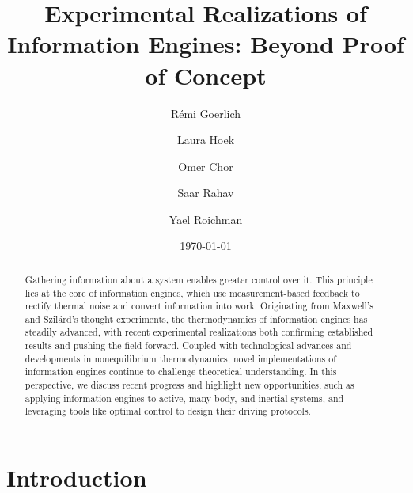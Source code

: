 \documentclass[aps, twocolumn,floatfix,showpacs, superscriptaddress]{revtex4-2}
\begin{document}
\title{Experimental Realizations of Information Engines: Beyond Proof of Concept}
\author{R\'emi Goerlich}
\author{Laura Hoek}
\author{Omer Chor}
\author{Saar Rahav}
\author{Yael Roichman}


\date{\today}
\begin{abstract}
    Gathering information about a system enables greater control over it. This principle lies at the core of information engines, which use measurement-based feedback to rectify thermal noise and convert information into work. Originating from Maxwell's and Szilárd's thought experiments, the thermodynamics of information engines has steadily advanced, with recent experimental realizations both confirming established results and pushing the field forward. Coupled with technological advances and developments in nonequilibrium thermodynamics, novel implementations of information engines continue to challenge theoretical understanding. In this perspective, we discuss recent progress and highlight new opportunities, such as applying information engines to active, many-body, and inertial systems, and leveraging tools like optimal control to design their driving protocols.
\end{abstract}

\maketitle

\section{Introduction}
\end{document}
